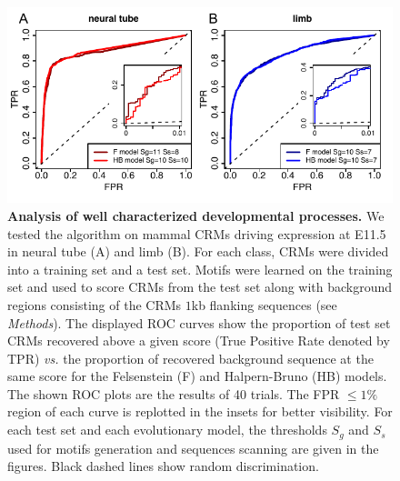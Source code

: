 \documentclass[a4,center,fleqn]{NAR}
\begin{document}
\clearpage
\begin{figure}[!htbp]
\begin{center}
\includegraphics[width=15cm]{figuresnar-sub/fig3.pdf}
\end{center}
\caption{ \normalsize
    {\bf Analysis of well characterized developmental processes.}   	
    We tested the algorithm on mammal CRMs driving expression at E11.5 in
    neural tube (A) and limb (B). 
    For each class, CRMs were divided into a training set and a test set. 
    Motifs were learned on the training set and used to
    score CRMs from the test set along with background regions 
    consisting of the CRMs $1$kb flanking sequences (see { \em Methods}). 
    The displayed ROC curves show the proportion of test set CRMs recovered
    above a given score (True Positive Rate denoted by TPR) {\em vs.}
    the proportion of  recovered background sequence at the same score for the
    Felsenstein (F) and Halpern-Bruno (HB) models.
    The shown ROC plots are the results of 40 trials.
    The FPR $\leq1\%$ region of each curve is replotted in the insets for
    better visibility.
    For each test set and each evolutionary model, the thresholds $S_g$ and
    $S_s$ used for motifs generation and sequences scanning are given in the
    figures.
    Black dashed lines show random discrimination.  }
    \label{fig:mamtrain}
\end{figure}
\end{document}
